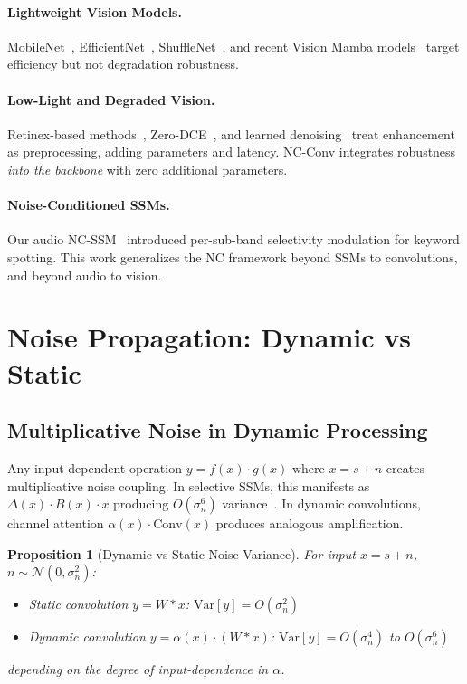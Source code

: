 \documentclass[10pt,twocolumn,letterpaper]{article}
\newtheorem{proposition}{Proposition}
\begin{document}
\paragraph{Lightweight Vision Models.}
MobileNet~\cite{howard2019searching}, EfficientNet~\cite{tan2019efficientnet}, ShuffleNet~\cite{zhang2018shufflenet}, and recent Vision Mamba models~\cite{zhu2024visionmamba,liu2024vmamba} target efficiency but not degradation robustness.

\paragraph{Low-Light and Degraded Vision.}
Retinex-based methods~\cite{land1977retinex,wei2018deepretinex}, Zero-DCE~\cite{guo2020zerodce}, and learned denoising~\cite{zamir2022restormer} treat enhancement as preprocessing, adding parameters and latency.
NC-Conv integrates robustness \emph{into the backbone} with zero additional parameters.

\paragraph{Noise-Conditioned SSMs.}
Our audio NC-SSM~\cite{choi2026ncssm} introduced per-sub-band selectivity modulation for keyword spotting.
This work generalizes the NC framework beyond SSMs to convolutions, and beyond audio to vision.


\section{Noise Propagation: Dynamic vs Static}
\label{sec:theory}

\subsection{Multiplicative Noise in Dynamic Processing}

Any input-dependent operation $y = f(x) \cdot g(x)$ where $x = s + n$ creates multiplicative noise coupling.
In selective SSMs, this manifests as $\Delta(x) \cdot B(x) \cdot x$ producing $O(\sigma_n^6)$ variance~\cite{choi2026ncssm}.
In dynamic convolutions, channel attention $\alpha(x) \cdot \text{Conv}(x)$ produces analogous amplification.

\begin{proposition}[Dynamic vs Static Noise Variance]
\label{prop:noise}
For input $x = s + n$, $n \sim \mathcal{N}(0, \sigma_n^2)$:
\begin{itemize}
\setlength\itemsep{0pt}
\item Static convolution $y = W \ast x$: $\text{Var}[y] = O(\sigma_n^2)$
\item Dynamic convolution $y = \alpha(x) \cdot (W \ast x)$: $\text{Var}[y] = O(\sigma_n^4)$ to $O(\sigma_n^6)$
\end{itemize}
depending on the degree of input-dependence in $\alpha$.
\end{proposition}
\end{document}
